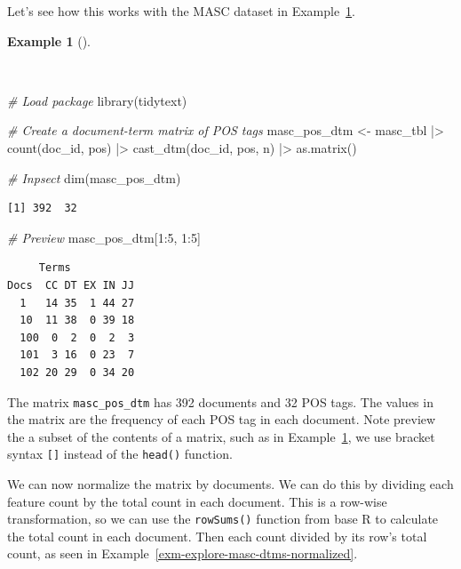 \documentclass[
  letterpaper,
]{latex/krantz}
\newenvironment{Shaded}{\begin{snugshade}}{\end{snugshade}}
\newcommand{\CommentTok}[1]{\textcolor[rgb]{0.00,0.00,0.00}{\textit{#1}}}
\newcommand{\DecValTok}[1]{\textcolor[rgb]{0.00,0.00,0.00}{#1}}
\newcommand{\FunctionTok}[1]{\textcolor[rgb]{0.00,0.00,0.00}{#1}}
\newcommand{\NormalTok}[1]{\textcolor[rgb]{0.00,0.00,0.00}{#1}}
\newcommand{\OtherTok}[1]{\textcolor[rgb]{0.00,0.00,0.00}{#1}}
\newcommand{\SpecialCharTok}[1]{\textcolor[rgb]{0.00,0.00,0.00}{#1}}
\theoremstyle{definition}
\newtheorem{example}{Example}[chapter]
\theoremstyle{remark}
\begin{document}
Let's see how this works with the MASC dataset in
Example~\ref{exm-explore-masc-dtms}.

\begin{example}[]\protect\hypertarget{exm-explore-masc-dtms}{}\label{exm-explore-masc-dtms}

~

\begin{Shaded}
\begin{Highlighting}[]
\CommentTok{\# Load package}
\FunctionTok{library}\NormalTok{(tidytext)}

\CommentTok{\# Create a document{-}term matrix of POS tags}
\NormalTok{masc\_pos\_dtm }\OtherTok{\textless{}{-}}
\NormalTok{  masc\_tbl }\SpecialCharTok{|\textgreater{}}
  \FunctionTok{count}\NormalTok{(doc\_id, pos) }\SpecialCharTok{|\textgreater{}}
  \FunctionTok{cast\_dtm}\NormalTok{(doc\_id, pos, n) }\SpecialCharTok{|\textgreater{}}
  \FunctionTok{as.matrix}\NormalTok{()}

\CommentTok{\# Inpsect}
\FunctionTok{dim}\NormalTok{(masc\_pos\_dtm)}
\end{Highlighting}
\end{Shaded}

\begin{verbatim}
[1] 392  32
\end{verbatim}

\begin{Shaded}
\begin{Highlighting}[]
\CommentTok{\# Preview}
\NormalTok{masc\_pos\_dtm[}\DecValTok{1}\SpecialCharTok{:}\DecValTok{5}\NormalTok{, }\DecValTok{1}\SpecialCharTok{:}\DecValTok{5}\NormalTok{]}
\end{Highlighting}
\end{Shaded}

\begin{verbatim}
     Terms
Docs  CC DT EX IN JJ
  1   14 35  1 44 27
  10  11 38  0 39 18
  100  0  2  0  2  3
  101  3 16  0 23  7
  102 20 29  0 34 20
\end{verbatim}

\end{example}

The matrix \texttt{masc\_pos\_dtm} has 392 documents and 32 POS tags.
The values in the matrix are the frequency of each POS tag in each
document. Note preview the a subset of the contents of a matrix, such as
in Example~\ref{exm-explore-masc-dtms}, we use bracket syntax
\texttt{{[}{]}} instead of the \texttt{head()} function.

We can now normalize the matrix by documents. We can do this by dividing
each feature count by the total count in each document. This is a
row-wise transformation, so we can use the \texttt{rowSums()} function
from base R to calculate the total count in each document. Then each
count divided by its row's total count, as seen in
Example~\ref{exm-explore-masc-dtms-normalized}.
\end{document}
